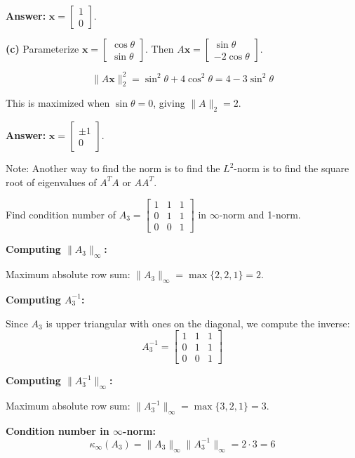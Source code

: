 \documentclass[reqno, answers]{exam}
\begin{document}
\begin{questions}
\begin{solution}
\textbf{Answer:} $\mathbf{x} = \begin{bmatrix} 1 \\ 0 \end{bmatrix}$.

\textbf{(c)} Parameterize $\mathbf{x} = \begin{bmatrix} \cos\theta \\ \sin\theta \end{bmatrix}$. Then $A\mathbf{x} = \begin{bmatrix} \sin\theta \\ -2\cos\theta \end{bmatrix}$.

\[
\|A\mathbf{x}\|_2^2 = \sin^2\theta + 4\cos^2\theta = 4 - 3\sin^2\theta
\]

This is maximized when $\sin\theta = 0$, giving $\|A\|_2 = 2$.

\textbf{Answer:} $\mathbf{x} = \begin{bmatrix} \pm 1 \\ 0 \end{bmatrix}$.

Note: Another way to find the norm is to find the $L^2$-norm is to find the square root of eigenvalues of $A^T A$ or $A A^T$.
\end{solution}

\newpage 
\question[10] Find condition number of $A_3 = \begin{bmatrix} 1 & 1 & 1 \\ 0 & 1 & 1 \\ 0 & 0 & 1 \end{bmatrix}$ in $\infty$-norm and 1-norm.

\begin{solution}
\textbf{Computing $\|A_3\|_\infty$:}

Maximum absolute row sum: $\|A_3\|_\infty = \max\{2, 2, 1\} = 2$.

\textbf{Computing $A_3^{-1}$:}

Since $A_3$ is upper triangular with ones on the diagonal, we compute the inverse:
\[
A_3^{-1} = \begin{bmatrix} 1 & 1 & 1 \\ 0 & 1 & 1 \\ 0 & 0 & 1 \end{bmatrix}
\]

\textbf{Computing $\|A_3^{-1}\|_\infty$:}

Maximum absolute row sum: $\|A_3^{-1}\|_\infty = \max\{3, 2, 1\} = 3$.

\textbf{Condition number in $\infty$-norm:}
\[
\kappa_\infty(A_3) = \|A_3\|_\infty \|A_3^{-1}\|_\infty = 2 \cdot 3 = 6
\]


\end{solution}
\end{questions}
\end{document}
